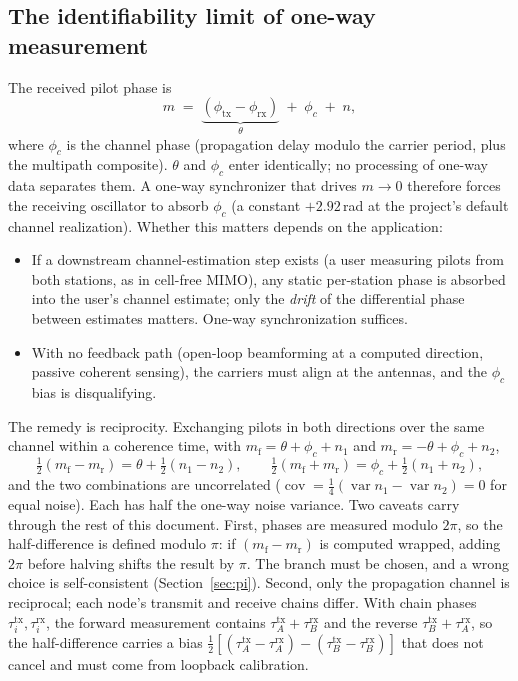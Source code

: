 \documentclass[10pt]{article}
\begin{document}
\subsection{The identifiability limit of one-way measurement}
The received pilot phase is
\begin{equation}
m \;=\; \underbrace{(\phi_{\mathrm{tx}}-\phi_{\mathrm{rx}})}_{\theta}
\;+\; \phi_c \;+\; n,
\label{eq:oneway}
\end{equation}
where $\phi_c$ is the channel phase (propagation delay modulo the carrier
period, plus the multipath composite). $\theta$ and $\phi_c$ enter
identically; no processing of one-way data separates them. A one-way
synchronizer that drives $m\to0$ therefore forces the receiving
oscillator to absorb $\phi_c$ (a constant $+2.92$\,rad at the project's
default channel realization). Whether this matters depends on the
application:
\begin{itemize}
\item If a downstream channel-estimation step exists (a user measuring
pilots from both stations, as in cell-free MIMO), any static per-station
phase is absorbed into the user's channel estimate; only the
\emph{drift} of the differential phase between estimates matters. One-way
synchronization suffices.
\item With no feedback path (open-loop beamforming at a computed
direction, passive coherent sensing), the carriers must align at the
antennas, and the $\phi_c$ bias is disqualifying.
\end{itemize}
The remedy is reciprocity. Exchanging pilots in both directions over the
same channel within a coherence time, with
$m_{\mathrm{f}}=\theta+\phi_c+n_1$ and $m_{\mathrm{r}}=-\theta+\phi_c+n_2$,
\begin{equation}
\tfrac12(m_{\mathrm{f}}-m_{\mathrm{r}})=\theta+\tfrac12(n_1{-}n_2),\qquad
\tfrac12(m_{\mathrm{f}}+m_{\mathrm{r}})=\phi_c+\tfrac12(n_1{+}n_2),
\label{eq:twoway}
\end{equation}
and the two combinations are uncorrelated
($\operatorname{cov}=\tfrac14(\operatorname{var}n_1-\operatorname{var}n_2)=0$
for equal noise). Each has half the one-way noise variance. Two caveats
carry through the rest of this document. First, phases are measured
modulo $2\pi$, so the half-difference is defined modulo $\pi$: if
$(m_{\mathrm{f}}-m_{\mathrm{r}})$ is computed wrapped, adding $2\pi$
before halving shifts the result by $\pi$. The branch must be chosen, and
a wrong choice is self-consistent (Section~\ref{sec:pi}). Second, only
the propagation channel is reciprocal; each node's transmit and receive
chains differ. With chain phases $\tau^{\mathrm{tx}}_i,
\tau^{\mathrm{rx}}_i$, the forward measurement contains
$\tau^{\mathrm{tx}}_A+\tau^{\mathrm{rx}}_B$ and the reverse
$\tau^{\mathrm{tx}}_B+\tau^{\mathrm{rx}}_A$, so the half-difference
carries a bias
$\tfrac12[(\tau^{\mathrm{tx}}_A-\tau^{\mathrm{rx}}_A)-
(\tau^{\mathrm{tx}}_B-\tau^{\mathrm{rx}}_B)]$
that does not cancel and must come from loopback calibration.
\end{document}
